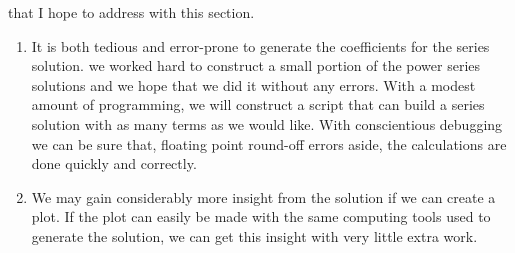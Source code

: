  that I hope to address with this section.  
\begin{enumerate}
\item It is both tedious and error-prone to generate the coefficients for the series solution.  we worked hard to construct a small portion of the power series solutions and we hope that we did it without any errors.  With a modest amount of programming, we will construct a script that can build a series solution with as many terms as we would like.  With conscientious debugging we can be sure that, floating point round-off errors aside, the calculations are done quickly and correctly.  

\item We may gain considerably more insight from the solution if we can create a plot.  If the plot can easily be made with the same computing tools used to generate the solution, we can get this insight with very little extra work.
\end{enumerate}

